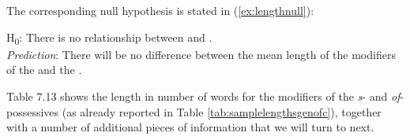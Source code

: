The corresponding null hypothesis is stated in (\ref{ex:lengthnull}):

\begin{exe}
\ex H\textsubscript{0}: There is no relationship between  and . \\
\textit{Prediction}: There will be no difference between the mean length of the modifiers of the  and the .
\label{ex:lengthnull}
\end{exe}

Table 7.13 shows the length in number of words for the modifiers of the \textit{s}- and \textit{of}-possessives (as already reported in Table \ref{tab:samplelengthsgenofc}), together with a number of additional pieces of information that we will turn to next.

